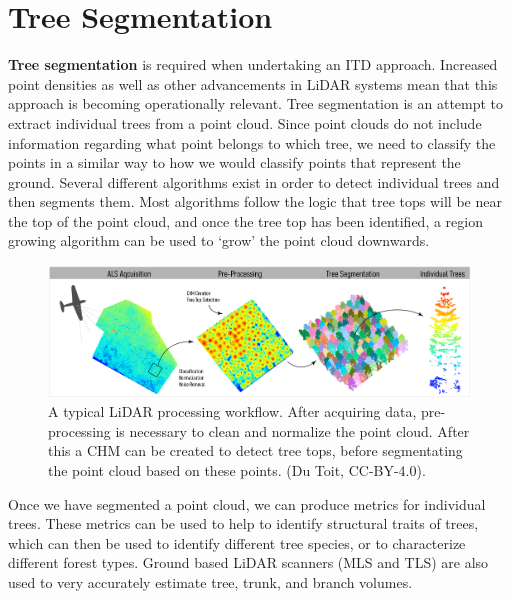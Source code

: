 \documentclass[
]{book}
\begin{document}
\hypertarget{tree-segmentation}{%
\section{Tree Segmentation}\label{tree-segmentation}}

\textbf{Tree segmentation} is required when undertaking an ITD approach. Increased point densities as well as other advancements in LiDAR systems mean that this approach is becoming operationally relevant. Tree segmentation is an attempt to extract individual trees from a point cloud. Since point clouds do not include information regarding what point belongs to which tree, we need to classify the points in a similar way to how we would classify points that represent the ground. Several different algorithms exist in order to detect individual trees and then segments them. Most algorithms follow the logic that tree tops will be near the top of the point cloud, and once the tree top has been identified, a region growing algorithm can be used to `grow' the point cloud downwards.

\begin{figure}
\includegraphics[width=0.9\linewidth]{images/15-Processing-Flowchart} \caption{A typical LiDAR processing workflow. After acquiring data, pre-processing is necessary to clean and normalize the point cloud. After this a CHM can be created to detect tree tops, before segmentating the point cloud based on these points. (Du Toit, CC-BY-4.0).}\label{fig:15-Processing-Flowchart}
\end{figure}

Once we have segmented a point cloud, we can produce metrics for individual trees. These metrics can be used to help to identify structural traits of trees, which can then be used to identify different tree species, or to characterize different forest types. Ground based LiDAR scanners (MLS and TLS) are also used to very accurately estimate tree, trunk, and branch volumes.
\end{document}
